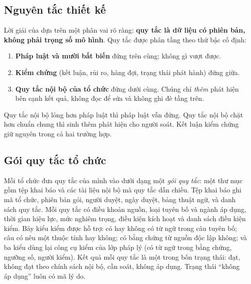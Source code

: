 \subsection{Nguyên tắc thiết kế}

Lời giải của \tensp{} dựa trên một phân vai rõ ràng: \textbf{quy tắc là dữ liệu có phiên bản, không phải trọng số mô hình}. Quy tắc được phân tầng theo thứ bậc cố định:
\begin{enumerate}
\item \textbf{Pháp luật và mười bất biến} đứng trên cùng; không gì vượt được.
\item \textbf{Kiểm chứng} (kết luận, rủi ro, hàng đợi, trạng thái phát hành) đứng giữa.
\item \textbf{Quy tắc nội bộ của tổ chức} đứng dưới cùng. Chúng chỉ \emph{thêm} phát hiện bên cạnh kết quả, không đọc để sửa và không ghi đè tầng trên.
\end{enumerate}
Quy tắc nội bộ lỏng hơn pháp luật thì pháp luật vẫn đứng. Quy tắc nội bộ chặt hơn chuẩn chung thì sinh thêm phát hiện cho người soát. Kết luận kiểm chứng giữ nguyên trong cả hai trường hợp.

\subsection{Gói quy tắc tổ chức}

Mỗi tổ chức đưa quy tắc của mình vào dưới dạng một \emph{gói quy tắc}: một thư mục gồm tệp khai báo và các tài liệu nội bộ mà quy tắc dẫn chiếu. Tệp khai báo ghi mã tổ chức, phiên bản gói, người duyệt, ngày duyệt, bảng thuật ngữ, và danh sách quy tắc. Mỗi quy tắc có điều khoản nguồn, loại tuyên bố và ngành áp dụng, thời gian hiệu lực, mức nghiêm trọng, điều kiện kích hoạt và danh sách điều kiện kiểm. Bảy kiểu kiểm được hỗ trợ: có hay không có từ ngữ trong câu tuyên bố; câu có nêu một thuộc tính hay không; có bằng chứng từ nguồn độc lập không; và ba kiểu dùng lại công cụ kiểm của lớp pháp lý (có từ ngữ trong bằng chứng, ngưỡng số, người kiểm). Kết quả mỗi quy tắc là một trong bốn trạng thái: đạt, không đạt theo chính sách nội bộ, cần soát, không áp dụng. Trạng thái “không áp dụng” luôn có mã lý do.

